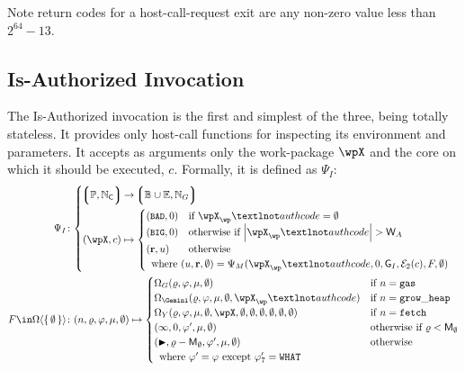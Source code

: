 Note return codes for a host-call-request exit are any non-zero value less than $2^{64} - 13$.

\subsection{Is-Authorized Invocation}\label{sec:isauthorizedinvocation}

The Is-Authorized invocation is the first and simplest of the three, being totally stateless. It provides only host-call functions for inspecting its environment and parameters. It accepts as arguments only the work-package $\wpX$ and the core on which it should be executed, $c$. Formally, it is defined as $\Psi_I$:
\begin{align}
  \label{eq:isauthinvocation}
  \Psi_I &\colon \abracegroup{
    \tuple{\workpackage, \coreindex} &\to \tuple{\blob \cup \workerror, \gas} \\
    \tup{\wpX, c} &\mapsto \begin{cases}
      \tup{\token{BAD}, 0} &\when \wpX_\wp¬authcode = \none \\
      \tup{\token{BIG}, 0} &\otherwhen \len{\wpX_\wp¬authcode} > \Cmaxauthcodesize \\
      \tup{\mathbf{r}, u} &\otherwise \\
      \multicolumn{2}{l}{\where \tup{u, \mathbf{r}, \none} = \Psi_M(\wpX_\wp¬authcode, 0, \Cpackageauthgas, \encode[2]{c}, F, \none)}\\
    \end{cases}\\
  } \\
  \label{eq:isauthorizedmutator}F \in \contextmutator{\set{\none}} &\colon
    \tup{n, \gascounter, \registers, \memory, \none} \mapsto \begin{cases}
      \Omega_G(\gascounter, \registers, \memory, \none) &\when n = \mathtt{gas} \\
      \Omega_\Gemini(\gascounter, \registers, \memory, \none, \wpX_\wp¬authcode) &\when n = \mathtt{grow\_heap} \\
      \Omega_Y(\gascounter, \registers, \memory, \none, \wpX, \none, \none, \none, \none, \none, \none) &\when n = \mathtt{fetch} \\
      \tup{\oog, 0, \registers', \memory, \none} &\otherwhen \gascounter < \Cgasunknown \\
      \tup{\continue, \gascounter - \Cgasunknown, \registers', \memory, \none} &\otherwise \\
      \multicolumn{2}{l}{\where \registers' = \registers \exc \registers'_7 = \mathtt{WHAT}}
    \end{cases}
\end{align}

